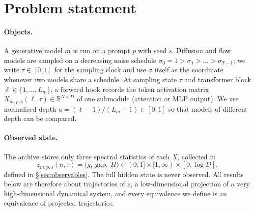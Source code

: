 \documentclass[11pt]{article}
\theoremstyle{definition}
\newcommand{\R}{\mathbb{R}}
\newcommand{\gap}{\mathrm{gap}}
\begin{document}
\tableofcontents
\newpage

\section{Problem statement}\label{sec:problem}

\paragraph{Objects.} A generative model $m$ is run on a prompt $p$ with seed $s$. Diffusion and flow models are sampled on a decreasing noise schedule $\sigma_0=1>\sigma_1>\dots>\sigma_{T-1}$; we write $\tau\in[0,1]$ for the sampling clock and use $\sigma$ itself as the coordinate whenever two models share a schedule. At sampling state $\tau$ and transformer block $\ell\in\{1,\dots,L_m\}$, a forward hook records the token activation matrix $X_{m,p,s}(\ell,\tau)\in\R^{N\times D}$ of one submodule (attention or MLP output). We use normalised depth $u=(\ell-1)/(L_m-1)\in[0,1]$ so that models of different depth can be compared.

\paragraph{Observed state.} The archive stores only three spectral statistics of each $X$, collected in
\begin{equation}
 z_{m,p,s}(u,\tau)=\big(g,\ \gap,\ H\big)\in(0,1]\times[1,\infty)\times[0,\log D],
\end{equation}
defined in \S\ref{sec:observables}. The full hidden state is never observed. All results below are therefore about trajectories of $z$, a low-dimensional projection of a very high-dimensional dynamical system, and every equivalence we define is an equivalence of projected trajectories.
\end{document}
